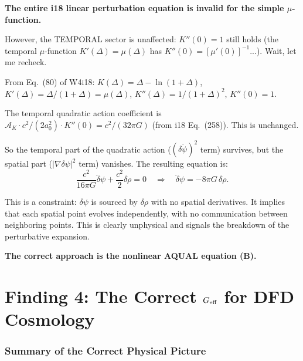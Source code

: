 \documentclass[11pt]{article}
\newcommand{\dpsi}{\delta\psi}
\newcommand{\aM}{a_0}
\begin{document}
\textbf{The entire i18 linear perturbation equation is invalid for
the simple $\mu$-function.}

However, the TEMPORAL sector is unaffected: $K''(0) = 1$ still holds
(the temporal $\mu$-function $K'(\Delta) = \mu(\Delta)$ has
$K''(0) = [\mu'(0)]^{-1}... $). Wait, let me recheck.

From Eq.~(80) of W4i18: $K(\Delta) = \Delta - \ln(1+\Delta)$,
$K'(\Delta) = \Delta/(1+\Delta) = \mu(\Delta)$,
$K''(\Delta) = 1/(1+\Delta)^2$, $K''(0) = 1$.

The temporal quadratic action coefficient is $\mathcal{A}_K \cdot c^2/(2\aM^2)
\cdot K''(0) = c^2/(32\pi G)$ (from i18 Eq.~(258)). This is unchanged.

So the temporal part of the quadratic action ($(\delta\dot\psi)^2$ term)
survives, but the spatial part ($|\nabla\dpsi|^2$ term) vanishes.
The resulting equation is:
\begin{equation}
\frac{c^2}{16\pi G}\ddot\dpsi + \frac{c^2}{2}\delta\rho = 0
\quad\Longrightarrow\quad
\ddot\dpsi = -8\pi G\,\delta\rho.
\label{eq:degenerate-EOM}
\end{equation}

This is a constraint: $\dpsi$ is sourced by $\delta\rho$ with no
spatial derivatives. It implies that each spatial point evolves
independently, with no communication between neighboring points.
This is clearly unphysical and signals the breakdown of the
perturbative expansion.

\textbf{The correct approach is the nonlinear AQUAL equation (B).}


\part{Finding 4: The Correct $G_{\rm eff}$ for DFD Cosmology}
\label{part:correct-Geff}

\section{Summary of the Correct Physical Picture}
\end{document}
